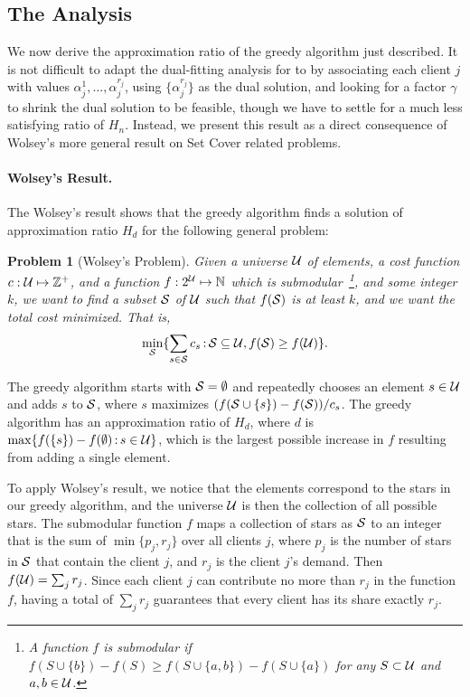 \documentclass[oneside,final]{ucr}
\newtheorem{problem}[theorem]{Problem}
\begin{document}
\subsection{The Analysis}
We now derive the approximation ratio of the greedy
algorithm just described. It is not difficult to adapt the
dual-fitting analysis for {\UFL} to {\FTFP} by associating
each client $j$ with values
$\alpha_j^1,\ldots,\alpha_j^{r_j}$, using
$\{\alpha_j^{r_j}\}$ as the dual solution, and looking for a
factor $\gamma$ to shrink the dual solution to be feasible,
though we have to settle for a much less satisfying ratio of
$H_n$. Instead, we present this result as a direct
consequence of Wolsey's more general result on Set Cover
related problems.

\paragraph{Wolsey's Result.}
The Wolsey's result shows that the greedy algorithm finds a
solution of approximation ratio $H_d$ for the following
general problem:

\begin{problem}[Wolsey's Problem]
  Given a universe $\calU$ of elements, a cost function $c:
  \calU \mapsto \mathbb{Z}^+$, and a function $f : 2^\calU
  \mapsto \mathbb{N}$ which is submodular~\footnote{A
    function $f$ is submodular if $f(S \cup \{b\}) -
    f(S) \geq f(S \cup \{a,b\}) - f (S \cup \{a\})$ for
    any $S \subset \calU$ and $a, b \in \calU$.}, and some
  integer $k$, we want to find a subset $\calS$ of $\calU$
  such that $f(\calS)$ is at least $k$, and we want the
  total cost minimized. That is,
\begin{equation*}
  \min_{\calS} \{ \sum_{s\in\calS} c_s \suchthat
  \calS\subseteq \calU, f(\calS) \geq f(\calU)\}.
\end{equation*}
\end{problem}

The greedy algorithm starts with $\calS = \emptyset$ and
repeatedly chooses an element $s \in \calU$ and adds $s$ to
$\calS$, where $s$ maximizes $(f(\calS \cup \{s\}) -
f(\calS)) / c_s$. The greedy algorithm has an approximation
ratio of $H_d$, where $d$ is $\max\{f(\{s\}) - f(\emptyset)
\suchthat s \in \calU\}$, which is the largest possible
increase in $f$ resulting from adding a single element.

To apply Wolsey's result, we notice that the elements
correspond to the stars in our greedy algorithm, and the
universe $\calU$ is then the collection of all possible
stars. The submodular function $f$ maps a collection of
stars as $\calS$ to an integer that is the sum of
$\min\{p_j, r_j\}$ over all clients $j$, where $p_j$ is the
number of stars in $\calS$ that contain the client $j$, and
$r_j$ is the client $j$'s demand. Then $f(\calU) = \sum_{j}
r_j$. Since each client $j$ can contribute no more than
$r_j$ in the function $f$, having a total of $\sum_j r_j$
guarantees that every client has its share exactly $r_j$.
\end{document}
